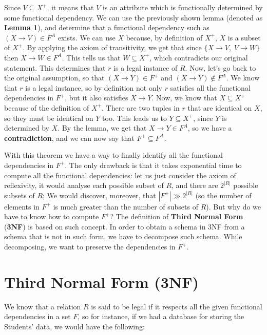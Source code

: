 \begin{longproof}
    Since $V \subseteq X^+$, it means that $V$ is an attribute which is functionally determined by some functional dependency. We can use the previously shown lemma (denoted as \textbf{Lemma 1}), and determine that a functional dependency such as $(X \rightarrow V) \in F^A$ exists. We can use $X$ because, by definition of $X^+$, $X$ is a subset of $X^+$. By applying the axiom of transitivity, we get that since $\{ X \rightarrow V, \; V \rightarrow W\}$ then $X \rightarrow W \in F^A$. This tells us that $W \subseteq X^+$, which contradicts our original statement. This determines that $r$ is a legal instance of $R$.
    \nwl
    Now, let's go back to the original assumption, so that $(X \rightarrow Y) \in F^+$ and $(X \rightarrow Y) \notin F^A$. We know that $r$ is a legal instance, so by definition not only $r$ satisfies all the functional dependencies in $F^+$, but it also satisfies $X \rightarrow Y$. Now, we know that $X \subseteq X^+$ because of the definition of $X^+$. There are two tuples in $r$ that are identical on $X$, so they must be identical on $Y$ too. This leads us to $Y \subseteq X^+$, since $Y$ is determined by $X$. By the lemma, we get that $X \rightarrow Y \in F^A$, so we have a \textbf{contradiction}, and we can now say that $F^+ \subseteq F^A$.
\end{longproof}

With this theorem we have a way to finally identify all the functional dependencies in $F^+$. The only drawback is that it takes exponential time to compute all the functional dependencies: let us just consider the axiom of reflexivity, it would analyse each possible subset of $R$, and there are $2^{|R|}$ possible subsets of $R$; We would discover, moreover, that $|F^+| \gg 2^{|R|}$ (so the number of elements in $F^+$ is much greater than the number of subsets of $R$).
\nwl
But why do we have to know how to compute $F^+$? The definition of \textbf{Third Normal Form} (\textbf{3NF}) is based on such concept. In order to obtain a schema in 3NF from a schema that is not in such form, we have to decompose such schema. While decomposing, we want to preserve the dependencies in $F^+$.

\section{Third Normal Form (3NF)}

We know that a relation $R$ is said to be legal if it respects all the given functional dependencies in a set $F$, so for instance, if we had a database for storing the Students' data, we would have the following:

